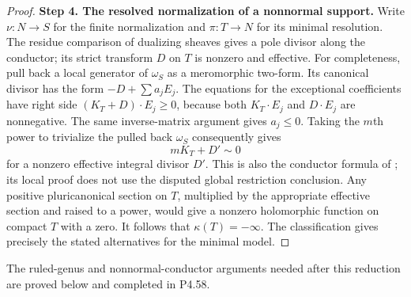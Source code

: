 \begin{proof}
\noindent\textbf{Step 4. The resolved normalization of a nonnormal support.}
Write $\nu:N\to S$ for the finite normalization and $\pi:T\to N$
for its minimal resolution. The residue comparison of dualizing
sheaves gives a pole divisor along the conductor; its strict
transform $D$ on $T$ is nonzero and effective. For completeness,
pull back a local generator of $\omega_S$ as a meromorphic
two-form. Its canonical divisor has the form $-D+\sum a_jE_j$.
The equations for the exceptional coefficients have right side
$(K_T+D)\cdot E_j\ge0$, because both $K_T\cdot E_j$ and
$D\cdot E_j$ are nonnegative. The same inverse-matrix argument
gives $a_j\le0$. Taking the $m$th power to trivialize the pulled
back $\omega_S$ consequently gives
\[
 mK_T+D'\sim0
\]
for a nonzero effective integral divisor $D'$. This is also the
conductor formula of \cite[Lemma~4.6, p.~7 of the attached-source edition]{CDP20}; its local proof does
not use the disputed global restriction conclusion. Any
positive pluricanonical section on $T$, multiplied by the
appropriate effective section and raised to a power, would give
a nonzero holomorphic function on compact $T$ with a zero.
It follows that $\kappa(T)=-\infty$. The classification \cite[Chapter~VI, Theorem~1.1, p.~243]{BHPV2004E}
gives precisely the stated alternatives for the minimal model.
\end{proof}

The ruled-genus and nonnormal-conductor arguments needed after
this reduction are proved below and completed in P4.58.

